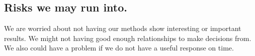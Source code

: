 \documentclass[11pt]{report}
\begin{document}
\subsection*{\hspace{-.5cm} Risks we may run into.}\label{tech}
We are worried about not having our methods show interesting or important results.  We might not having good enough relationships to make decisions from.  We also could have a problem if we do not have a useful response on time.  
\end{document}
